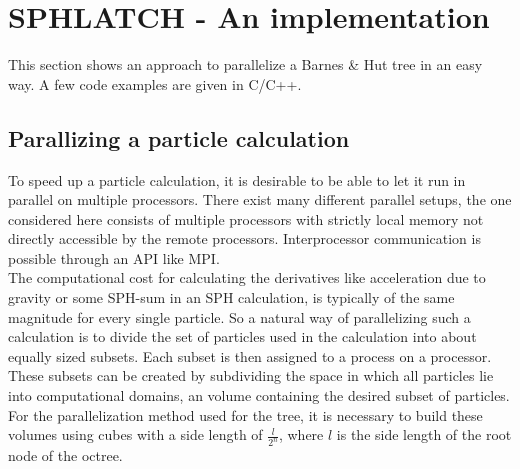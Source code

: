 
\section{SPHLATCH - An implementation}

This section shows an approach to parallelize a Barnes \& Hut tree in an easy way. A few code examples are given in C/C++.

\subsection{Parallizing a particle calculation}
To speed up a particle calculation, it is desirable to be able to let it run in parallel on multiple processors. There exist many different parallel setups, the one considered here consists of multiple processors with strictly local memory not directly accessible by the remote processors. Interprocessor communication is possible through an API like MPI.\\

The computational cost for calculating the derivatives like acceleration due to gravity or some SPH-sum in an SPH calculation, is typically of the same magnitude for every single particle. So a natural way of parallelizing such a calculation is to divide the set of particles used in the calculation into about equally sized subsets. Each subset is then assigned to a process on a processor. These subsets can be created by subdividing the space in which all particles lie into computational domains, an volume containing the desired subset of particles. For the parallelization method used for the tree, it is necessary to build these volumes using cubes with a side length of $\frac{l}{2^{n}}$, where $l$ is the side length of the root node of the octree.

